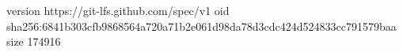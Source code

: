 version https://git-lfs.github.com/spec/v1
oid sha256:6841b303cfb9868564a720a71b2e061d98da78d3cdc424d524833cc791579baa
size 174916
